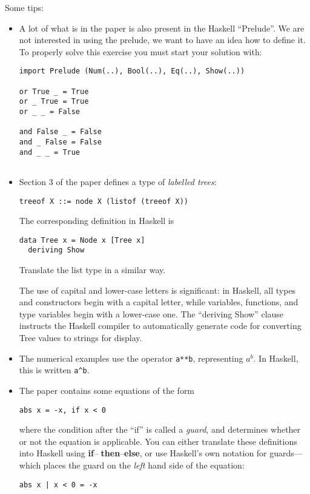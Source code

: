 \documentclass{article}
\begin{document}
Some tips:
\begin{itemize}
\item

A lot of what is in the paper is also present in the Haskell ``Prelude''.
We are not interested in using the prelude, we want to have an idea how
to define it. To properly solve this exercise you must start your solution
with: 

\begin{verbatim}
import Prelude (Num(..), Bool(..), Eq(..), Show(..))

or True _ = True
or _ True = True
or _ _ = False

and False _ = False
and _ False = False
and _ _ = True


\end{verbatim}

\item
Section 3 of the paper defines a type of {\em labelled trees}:
\begin{verbatim}
treeof X ::= node X (listof (treeof X))
\end{verbatim}
The corresponding definition in Haskell is
\begin{verbatim}
data Tree x = Node x [Tree x]
  deriving Show
\end{verbatim}
Translate the list type in a similar way.

The use of capital and lower-case letters is significant: in Haskell,
all types and constructors begin with a capital letter, while
variables, functions, and type variables begin with a lower-case
one. The ``deriving Show'' clause instructs the Haskell compiler to
automatically generate code for converting Tree values to strings for
display.
\item
The numerical examples use the operator \verb!a**b!, representing
$a^b$. In Haskell, this is written \verb!a^b!.
\item
The paper contains some equations of the form
\begin{verbatim}
abs x = -x, if x < 0
\end{verbatim}
where the condition after the ``if'' is called a {\em guard}, and
determines whether or not the equation is applicable. You can either
translate these definitions into Haskell using {\bf if}--{\bf
  then}--{\bf else}, or use Haskell's own notation for guards---which
places the guard on the {\em left} hand side of the equation:
\begin{verbatim}
abs x | x < 0 = -x
\end{verbatim}
\end{itemize}
\end{document}
